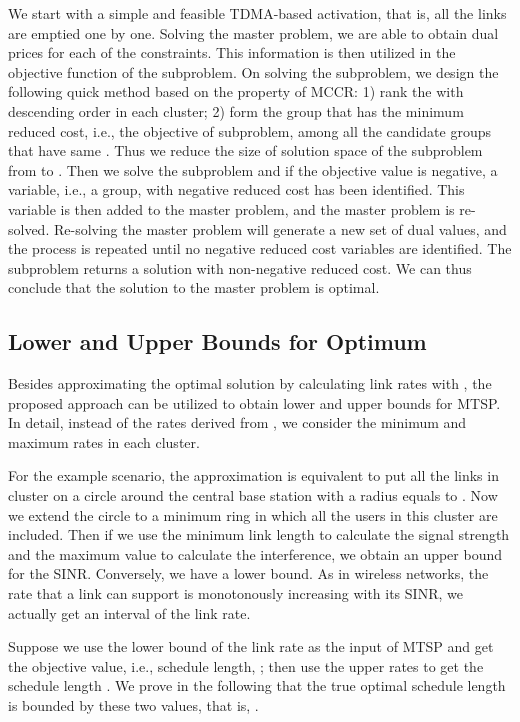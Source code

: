 \documentclass[10pt,onecolumn,journal,draftcls,oneside]{IEEEtran}
\newcounter{exam}
\begin{document}
We start with a simple and feasible TDMA-based activation, that is, all the  links are emptied one by one. Solving the master problem, we are able to obtain dual prices  for each of the constraints. This information is then utilized in the objective function of the subproblem. On solving the subproblem, we design the following quick method based on the property of MCCR: 1) rank the  with descending order in each cluster; 2) form the group that has the minimum reduced cost, i.e., the objective of subproblem, among all the candidate groups that have same . Thus we reduce the size of solution space of the subproblem from  to . Then we solve the subproblem and if the objective value is negative, a variable, i.e., a group, with negative reduced cost has been identified. This variable is then added to the master problem, and the master problem is re-solved. Re-solving the master problem will generate a new set of dual values, and the process is repeated until no negative reduced cost variables are identified. The subproblem returns a solution with non-negative reduced cost. We can thus conclude that the solution to the master problem is optimal.

\subsection{Lower and Upper Bounds for Optimum}
Besides approximating the optimal solution by calculating link rates with , the proposed approach can be utilized to obtain lower and upper bounds for MTSP. In detail, instead of the rates derived from , we consider the minimum and maximum rates in each cluster. 

For the example scenario, the approximation is equivalent to put all the links in cluster  on a circle around the central base station with a radius equals to . Now we extend the circle to a minimum ring in which all the users in this cluster are included. Then if we use the minimum link length to calculate the signal strength and the maximum value to calculate the interference, we obtain an upper bound for the SINR. Conversely, we have a lower bound. As in wireless networks, the rate that a link can support is monotonously increasing with its SINR, we actually get an interval of the link rate. 

Suppose we use the lower bound of the link rate as the input of MTSP and get the objective value, i.e., schedule length, ; then use the upper rates to get the schedule length . We prove in the following that the true optimal schedule length  is bounded by these two values, that is, .
\end{document}
